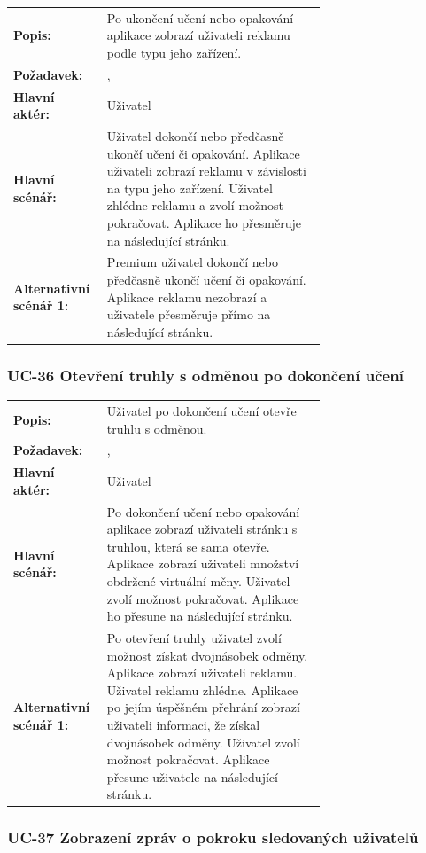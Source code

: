 \begin{tabular}{lp{0.7\linewidth}}
  \textbf{Popis:} & Po ukončení učení nebo opakování aplikace zobrazí uživateli reklamu podle typu jeho zařízení. \\
  \textbf{Požadavek:} & \nameref{sec:fp-advertisement}, \nameref{sec:fp-subscription-system} \\
  \textbf{Hlavní aktér:} & Uživatel \\
  \textbf{Hlavní scénář:} & Uživatel dokončí nebo předčasně ukončí učení či opakování. Aplikace uživateli zobrazí reklamu v závislosti na typu jeho zařízení. Uživatel zhlédne reklamu a zvolí možnost pokračovat. Aplikace ho přesměruje na následující stránku. \\
  \textbf{Alternativní scénář 1:} & Premium uživatel dokončí nebo předčasně ukončí učení či opakování. Aplikace reklamu nezobrazí a uživatele přesměruje přímo na následující stránku. \\
\end{tabular}

\subsubsection{UC-36 Otevření truhly s odměnou po dokončení učení}

\begin{tabular}{lp{0.7\linewidth}}
  \textbf{Popis:} & Uživatel po dokončení učení otevře truhlu s odměnou. \\
  \textbf{Požadavek:} & \nameref{sec:fp-treasure-chest}, \nameref{sec:fp-advertisement} \\
  \textbf{Hlavní aktér:} & Uživatel \\
  \textbf{Hlavní scénář:} & Po dokončení učení nebo opakování aplikace zobrazí uživateli stránku s truhlou, která se sama otevře. Aplikace zobrazí uživateli množství obdržené virtuální měny. Uživatel zvolí možnost pokračovat. Aplikace ho přesune na následující stránku. \\
  \textbf{Alternativní scénář 1:} & Po otevření truhly uživatel zvolí možnost získat dvojnásobek odměny. Aplikace zobrazí uživateli reklamu. Uživatel reklamu zhlédne. Aplikace po jejím úspěšném přehrání zobrazí uživateli informaci, že získal dvojnásobek odměny. Uživatel zvolí možnost pokračovat. Aplikace přesune uživatele na následující stránku. \\
\end{tabular}

\subsubsection{UC-37 Zobrazení zpráv o pokroku sledovaných uživatelů}

